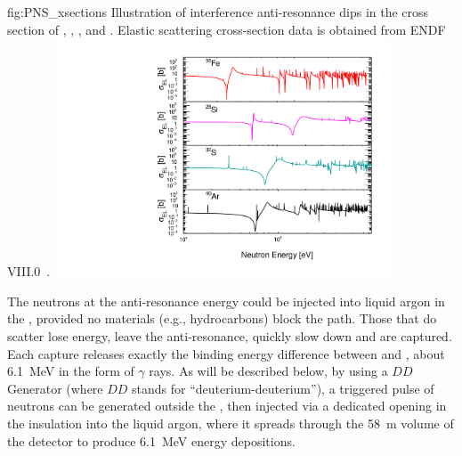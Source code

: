 \begin{dunefigure}{fig:PNS_xsections}
{Illustration of interference anti-resonance dips in the cross section of , , , and . Elastic scattering cross-section data is obtained from ENDF VIII.0~\cite{BROWN20181}.}
\includegraphics[width=10cm]{graphics/PNS_xsection.pdf}
\end{dunefigure}

The neutrons at the anti-resonance energy could be injected into liquid argon in the , provided no materials (e.g., hydrocarbons) block the path. Those that do scatter lose energy, leave the anti-resonance, quickly slow down and are captured. Each capture releases exactly the binding energy difference between  and , about \SI{6.1}{\MeV} in the form of $\gamma$ rays.  As will be described below, by using a $DD$ Generator (where $DD$ stands for ``deuterium-deuterium''), a triggered pulse of neutrons can be generated outside the , then injected via a dedicated opening in the insulation into the liquid argon, where it spreads through the \SI{58}{\m} volume of the detector to produce \SI{6.1}{\MeV} energy depositions.

